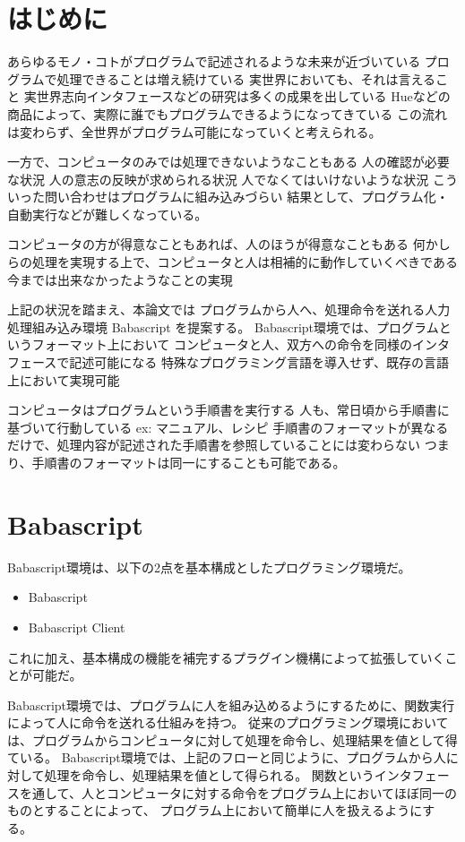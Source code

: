 \section{はじめに}\label{ux306fux3058ux3081ux306b}

あらゆるモノ・コトがプログラムで記述されるような未来が近づいている
プログラムで処理できることは増え続けている
実世界においても、それは言えること
実世界志向インタフェースなどの研究は多くの成果を出している
Hueなどの商品によって、実際に誰でもプログラムできるようになってきている
この流れは変わらず、全世界がプログラム可能になっていくと考えられる。

一方で、コンピュータのみでは処理できないようなこともある
人の確認が必要な状況 人の意志の反映が求められる状況
人でなくてはいけないような状況
こういった問い合わせはプログラムに組み込みづらい
結果として、プログラム化・自動実行などが難しくなっている。

コンピュータの方が得意なこともあれば、人のほうが得意なこともある
何かしらの処理を実現する上で、コンピュータと人は相補的に動作していくべきである
今までは出来なかったようなことの実現

上記の状況を踏まえ、本論文では
プログラムから人へ、処理命令を送れる人力処理組み込み環境 Babascript
を提案する。 Babascript環境では、プログラムというフォーマット上において
コンピュータと人、双方への命令を同様のインタフェースで記述可能になる
特殊なプログラミング言語を導入せず、既存の言語上において実現可能

コンピュータはプログラムという手順書を実行する
人も、常日頃から手順書に基づいて行動している ex: マニュアル、レシピ
手順書のフォーマットが異なるだけで、処理内容が記述された手順書を参照していることには変わらない
つまり、手順書のフォーマットは同一にすることも可能である。

\section{Babascript}\label{babascript}

Babascript環境は、以下の2点を基本構成としたプログラミング環境だ。

\begin{itemize}
\itemsep1pt\parskip0pt
\item
  Babascript
\item
  Babascript Client
\end{itemize}

これに加え、基本構成の機能を補完するプラグイン機構によって拡張していくことが可能だ。

Babascript環境では、プログラムに人を組み込めるようにするために、関数実行によって人に命令を送れる仕組みを持つ。
従来のプログラミング環境においては、プログラムからコンピュータに対して処理を命令し、処理結果を値として得ている。
Babascript環境では、上記のフローと同じように、プログラムから人に対して処理を命令し、処理結果を値として得られる。
関数というインタフェースを通して、人とコンピュータに対する命令をプログラム上においてほぼ同一のものとすることによって、
プログラム上において簡単に人を扱えるようにする。

